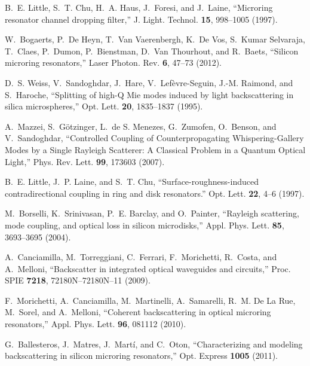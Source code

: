 \documentclass[10pt]{article}
\begin{document}
\begin{thebibliography}{10}
\newcommand{\enquote}[1]{``#1''}

B.~E. Little, S.~T. Chu, H.~A. Haus, J.~Foresi, and J.~Laine,
  \enquote{{Microring resonator channel dropping filter},} J. Light. Technol.
  \textbf{15}, 998--1005 (1997).

W.~Bogaerts, P.~{De Heyn}, T.~{Van Vaerenbergh}, K.~{De Vos}, S.~{Kumar
  Selvaraja}, T.~Claes, P.~Dumon, P.~Bienstman, D.~{Van Thourhout}, and
  R.~Baets, \enquote{{Silicon microring resonators},} Laser Photon. Rev.
  \textbf{6}, 47--73 (2012).

D.~S. Weiss, V.~Sandoghdar, J.~Hare, V.~Lef{\`{e}}vre-Seguin, J.-M. Raimond,
  and S.~Haroche, \enquote{{Splitting of high-Q Mie modes induced by light
  backscattering in silica microspheres},} Opt. Lett. \textbf{20}, 1835--1837
  (1995).

A.~Mazzei, S.~G{\"{o}}tzinger, L.~{de S. Menezes}, G.~Zumofen, O.~Benson, and
  V.~Sandoghdar, \enquote{{Controlled Coupling of Counterpropagating
  Whispering-Gallery Modes by a Single Rayleigh Scatterer: A Classical Problem
  in a Quantum Optical Light},} Phys. Rev. Lett. \textbf{99}, 173603 (2007).

B.~E. Little, J.~P. Laine, and S.~T. Chu, \enquote{{Surface-roughness-induced
  contradirectional coupling in ring and disk resonators.}} Opt. Lett.
  \textbf{22}, 4--6 (1997).

M.~Borselli, K.~Srinivasan, P.~E. Barclay, and O.~Painter, \enquote{{Rayleigh
  scattering, mode coupling, and optical loss in silicon microdisks},} Appl.
  Phys. Lett. \textbf{85}, 3693--3695 (2004).

A.~Canciamilla, M.~Torreggiani, C.~Ferrari, F.~Morichetti, R.~Costa, and
  A.~Melloni, \enquote{{Backscatter in integrated optical waveguides and
  circuits},} Proc. SPIE \textbf{7218}, 72180N--72180N--11 (2009).

F.~Morichetti, A.~Canciamilla, M.~Martinelli, A.~Samarelli, R.~M. {De La Rue},
  M.~Sorel, and A.~Melloni, \enquote{{Coherent backscattering in optical
  microring resonators},} Appl. Phys. Lett. \textbf{96}, 081112 (2010).

G.~Ballesteros, J.~Matres, J.~Mart{\'{i}}, and C.~Oton,
  \enquote{{Characterizing and modeling backscattering in silicon microring
  resonators},} Opt. Express \textbf{1005} (2011).


\end{thebibliography}
\end{document}

